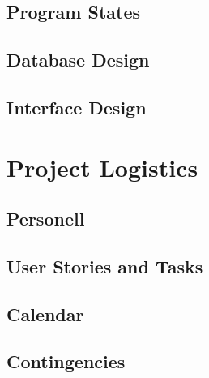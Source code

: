 \documentclass[12pt]{article}
\begin{document}
\subsection{Program States}

\subsection{Database Design}

\subsection{Interface Design}


\section{Project Logistics}

\subsection{Personell}

\subsection{User Stories and Tasks}

\subsection{Calendar}

\subsection{Contingencies}
\end{document}
